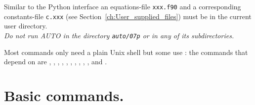 \documentclass[12pt]{report}
\begin{document}
Similar to the Python interface an equations-file {\tt xxx.f90}
and a corresponding constants-file {\tt c.xxx} 
(see Section~\ref{ch:User_supplied_files})
must be in the current user directory.
\\
{\it Do not run {\cal AUTO} in the directory {\tt auto/07p} 
or in any of its subdirectories.}

Most commands only need a plain Unix shell but some use \python: the
commands that depend on \python are ,
, , , ,
, , , ,
, and .

\section{ Basic commands.} 
\end{document}
